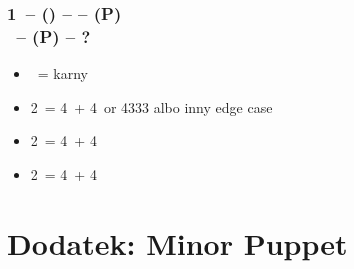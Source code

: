 \documentclass[12pt, a4paper]{report}
\begin{document}
{    \subsubsection*{1\ntx\ -- (\dbl) --  -- (P)\\
                    \rdbl\ -- (P) -- ?}
    \begin{itemize}
        \item \pass\ = karny
        \item 2\clubs\ = 4\clubs\ + 4\ or 4333 albo inny edge case
        \item 2\diams\ = 4\diams\ + 4\major
        \item 2\hearts\ = 4\hearts\ + 4\spades
    \end{itemize}

}

\section*{\colorbox{blue!30}{Dodatek: Minor Puppet}}
\end{document}
